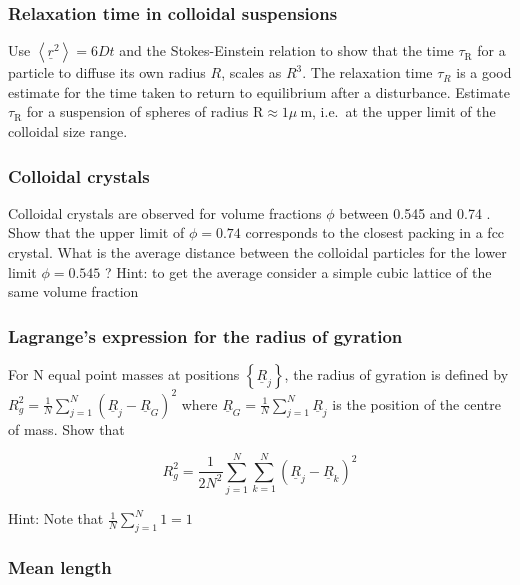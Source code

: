 \documentclass[
  letterpaper,
  DIV=11,
  numbers=noendperiod]{scrartcl}
\begin{document}
\subsubsection{Relaxation time in colloidal
suspensions}\label{relaxation-time-in-colloidal-suspensions}

Use \(\left\langle\underline{r}^{2}\right\rangle=6 D t\) and the
Stokes-Einstein relation to show that the time \(\tau_{\mathrm{R}}\) for
a particle to diffuse its own radius \(R\), scales as \(R^{3}\). The
relaxation time \(\tau_{R}\) is a good estimate for the time taken to
return to equilibrium after a disturbance. Estimate
\(\tau_{\mathrm{R}}\) for a suspension of spheres of radius
\(\mathrm{R} \approx 1 \mu \mathrm{~m}\), i.e.~at the upper limit of the
colloidal size range.

\subsubsection{Colloidal crystals}\label{colloidal-crystals}

Colloidal crystals are observed for volume fractions \(\phi\) between
0.545 and 0.74 . Show that the upper limit of \(\phi=0.74\) corresponds
to the closest packing in a fcc crystal. What is the average distance
between the colloidal particles for the lower limit \(\phi=0.545\) ?
Hint: to get the average consider a simple cubic lattice of the same
volume fraction

\subsubsection{Lagrange's expression for the radius of
gyration}\label{lagranges-expression-for-the-radius-of-gyration}

For N equal point masses at positions
\(\left\{\underline{R}_{j}\right\}\), the radius of gyration is defined
by
\(R_{g}^{2}=\frac{1}{N} \sum_{j=1}^{N}\left(\underline{R}_{j}-\underline{R}_{G}\right)^{2}\)
where \(\underline{R}_{G}=\frac{1}{N} \sum_{j=1}^{N} \underline{R}_{j}\)
is the position of the centre of mass. Show that

\[
R_{g}^{2}=\frac{1}{2 N^{2}} \sum_{j=1}^{N} \sum_{k=1}^{N}\left(\underline{R}_{j}-\underline{R}_{k}\right)^{2}
\]

Hint: Note that \(\frac{1}{N} \sum_{j=1}^{N} 1=1\)

\subsubsection{Mean length}\label{mean-length}
\end{document}
